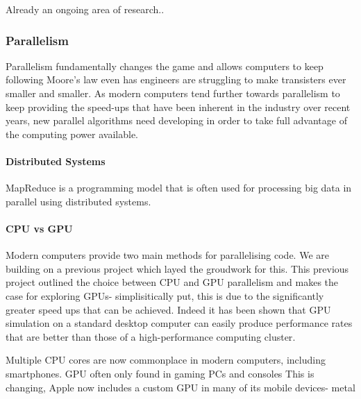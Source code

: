 \documentclass{UoYCSproject}
\begin{document}
Already an ongoing area of research.. 


\subsubsection{Parallelism}

Parallelism fundamentally changes the game and allows computers to keep following Moore's law even has engineers are struggling to make transisters ever smaller and smaller\cite{concurrency_revolution}. As modern computers tend further towards parallelism to keep providing the speed-ups that have been inherent in the industry over recent years, new parallel algorithms need developing in order to take full advantage of the computing power available.

\paragraph{Distributed Systems}
MapReduce is a programming model that is often used for processing big data in parallel using distributed systems.

\paragraph{CPU vs GPU}
Modern computers provide two main methods for parallelising code.
We are building on a previous project\cite{phil_diss} which layed the groudwork for this.
This previous project outlined the choice between CPU and GPU parallelism and makes the case for exploring GPUs- simplisitically put, this is due to the significantly greater speed ups that can be achieved. Indeed it has been shown that GPU simulation on a standard desktop computer can easily produce performance rates that are better than those of a high-performance computing cluster\cite{flame_simulation}.

Multiple CPU cores are now commonplace in modern computers, including smartphones.
GPU often only found in gaming PCs and consoles
This is changing, Apple now includes a custom GPU in many of its mobile devices- metal

\end{document}
